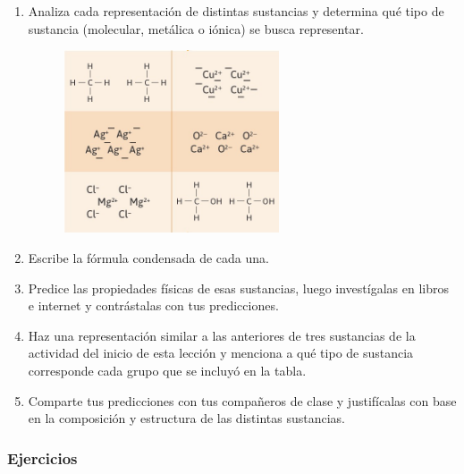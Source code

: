 \documentclass[11pt]{book}
\begin{document}
\begin{boxK}
  \begin{enumerate}
    \item Analiza cada representación de distintas sustancias y determina qué tipo de sustancia (molecular, metálica o iónica) se busca representar.
          \begin{figure}[H]
            \centering
            \includegraphics[width=0.6\textwidth]{formulas_condensadas.jpg}
          \end{figure}
    \item Escribe la fórmula condensada de cada una.
    \item Predice las propiedades físicas de esas sustancias, luego investígalas en libros e internet y contrástalas con tus predicciones.
    \item Haz una representación similar a las anteriores de tres sustancias de la actividad del inicio de esta lección y menciona a qué tipo de sustancia corresponde cada grupo que se incluyó en la tabla.
    \item Comparte tus predicciones con tus compañeros de clase y justifícalas con base en la composición y estructura de las distintas sustancias.
  \end{enumerate}
\end{boxK}

\subsubsection{Ejercicios}
\end{document}
